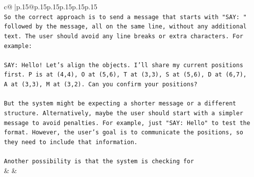 \documentclass{article}
\begin{document}
{\begin{supertabular}{c@{$\;$}|p{.15\linewidth}@{}p{.15\linewidth}p{.15\linewidth}p{.15\linewidth}p{.15\linewidth}p{.15\linewidth}}
{{{\\ 
\texttt{So the correct approach is to send a message that starts with "SAY: " followed by the message, all on the same line, without any additional text. The user should avoid any line breaks or extra characters. For example:} \\
\\ 
\texttt{SAY: Hello! Let's align the objects. I'll share my current positions first. P is at (4,4), O at (5,6), T at (3,3), S at (5,6), D at (6,7), A at (3,3), M at (3,2). Can you confirm your positions?} \\
\\ 
\texttt{But the system might be expecting a shorter message or a different structure. Alternatively, maybe the user should start with a simpler message to avoid penalties. For example, just "SAY: Hello" to test the format. However, the user's goal is to communicate the positions, so they need to include that information.} \\
\\ 
\texttt{Another possibility is that the system is checking for} \\
            }
        }
    }
    & & \\ \\


\end{supertabular}}
\end{document}
